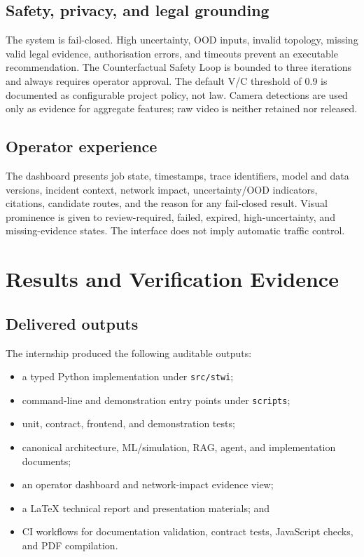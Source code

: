 \documentclass[12pt,a4paper]{report}
\begin{document}
\section{Safety, privacy, and legal grounding}

The system is fail-closed. High uncertainty, OOD inputs, invalid topology, missing valid legal evidence, authorisation errors, and timeouts prevent an executable recommendation. The Counterfactual Safety Loop is bounded to three iterations and always requires operator approval. The default V/C threshold of 0.9 is documented as configurable project policy, not law. Camera detections are used only as evidence for aggregate features; raw video is neither retained nor released.

\section{Operator experience}

The dashboard presents job state, timestamps, trace identifiers, model and data versions, incident context, network impact, uncertainty/OOD indicators, citations, candidate routes, and the reason for any fail-closed result. Visual prominence is given to review-required, failed, expired, high-uncertainty, and missing-evidence states. The interface does not imply automatic traffic control.

\chapter{Results and Verification Evidence}

\section{Delivered outputs}

The internship produced the following auditable outputs:

\begin{itemize}[leftmargin=1.2cm]
  \item a typed Python implementation under \texttt{src/stwi};
  \item command-line and demonstration entry points under \texttt{scripts};
  \item unit, contract, frontend, and demonstration tests;
  \item canonical architecture, ML/simulation, RAG, agent, and implementation documents;
  \item an operator dashboard and network-impact evidence view;
  \item a LaTeX technical report and presentation materials; and
  \item CI workflows for documentation validation, contract tests, JavaScript checks, and PDF compilation.
\end{itemize}
\end{document}
